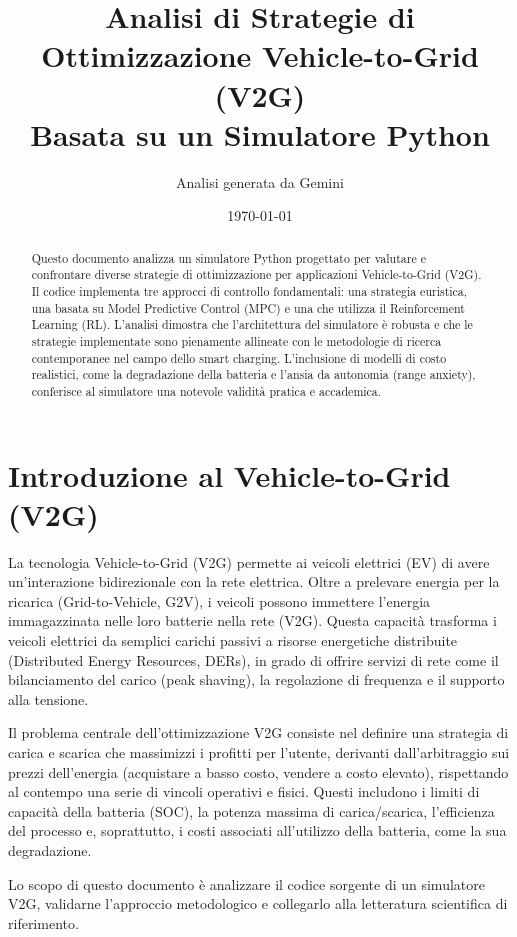 \documentclass[a4paper, 11pt]{article}
\title{Analisi di Strategie di Ottimizzazione Vehicle-to-Grid (V2G) \\ \large Basata su un Simulatore Python}
\author{Analisi generata da Gemini}
\date{\today}
\begin{document}
\maketitle

\begin{abstract}
Questo documento analizza un simulatore Python progettato per valutare e confrontare diverse strategie di ottimizzazione per applicazioni Vehicle-to-Grid (V2G). Il codice implementa tre approcci di controllo fondamentali: una strategia euristica, una basata su Model Predictive Control (MPC) e una che utilizza il Reinforcement Learning (RL). L'analisi dimostra che l'architettura del simulatore è robusta e che le strategie implementate sono pienamente allineate con le metodologie di ricerca contemporanee nel campo dello smart charging. L'inclusione di modelli di costo realistici, come la degradazione della batteria e l'ansia da autonomia (range anxiety), conferisce al simulatore una notevole validità pratica e accademica.
\end{abstract}

\tableofcontents

\section{Introduzione al Vehicle-to-Grid (V2G)}
La tecnologia Vehicle-to-Grid (V2G) permette ai veicoli elettrici (EV) di avere un'interazione bidirezionale con la rete elettrica. Oltre a prelevare energia per la ricarica (Grid-to-Vehicle, G2V), i veicoli possono immettere l'energia immagazzinata nelle loro batterie nella rete (V2G). Questa capacità trasforma i veicoli elettrici da semplici carichi passivi a risorse energetiche distribuite (Distributed Energy Resources, DERs), in grado di offrire servizi di rete come il bilanciamento del carico (peak shaving), la regolazione di frequenza e il supporto alla tensione.

Il problema centrale dell'ottimizzazione V2G consiste nel definire una strategia di carica e scarica che massimizzi i profitti per l'utente, derivanti dall'arbitraggio sui prezzi dell'energia (acquistare a basso costo, vendere a costo elevato), rispettando al contempo una serie di vincoli operativi e fisici. Questi includono i limiti di capacità della batteria (SOC), la potenza massima di carica/scarica, l'efficienza del processo e, soprattutto, i costi associati all'utilizzo della batteria, come la sua degradazione.

Lo scopo di questo documento è analizzare il codice sorgente di un simulatore V2G, validarne l'approccio metodologico e collegarlo alla letteratura scientifica di riferimento.
\end{document}
